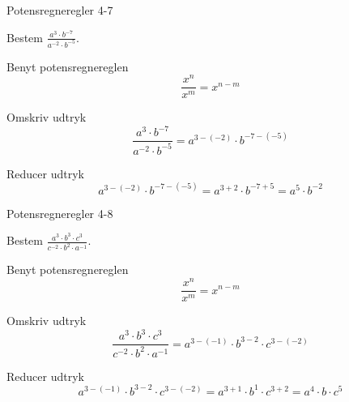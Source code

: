 \documentclass{article}
\begin{document}
\newpage

\begin{exercise}{Potensregneregler 4-7}
	
	Bestem $\frac{a^3 \cdot b^{-7}}{a^{-2}\cdot b^{-5}}$.
	
	
	\hint
	
	Benyt potensregnereglen
	\[
	\frac{x^n}{x^m} = x^{n-m} 
	\]
	
	\hint 
	
	Omskriv udtryk
	\[
	\frac{a^3 \cdot b^{-7}}{a^{-2}\cdot b^{-5}} = a^{3-(-2)} \cdot b^{-7-(-5)}	
	\]
	
	\hint
	
	Reducer udtryk
	\[
	a^{3-(-2)} \cdot b^{-7-(-5)} = a^{3+2} \cdot b^{-7+5} = a^5 \cdot b^{-2}
	\]
	
	
\end{exercise}

\newpage

\begin{exercise}{Potensregneregler 4-8}
	
	Bestem $\frac{a^3 \cdot b^3 \cdot c^3}{c^{-2} \cdot b^2 \cdot a^{-1}}$.
	
	
	\hint
	
	Benyt potensregnereglen
	\[
	\frac{x^n}{x^m} = x^{n-m} 
	\]
	
	\hint 
	
	Omskriv udtryk
	\[
	\frac{a^3 \cdot b^3 \cdot c^3}{c^{-2} \cdot b^2 \cdot a^{-1}} = a^{3-(-1)} \cdot b^{3-2} \cdot c^{3-(-2)}
	\]
	
	\hint
	
	Reducer udtryk
	\[
	a^{3-(-1)} \cdot b^{3-2} \cdot c^{3-(-2)} = a^{3+1} \cdot b^1 \cdot c^{3+2} = a^4 \cdot b \cdot c^5
	\]
	
	
\end{exercise}
\end{document}
